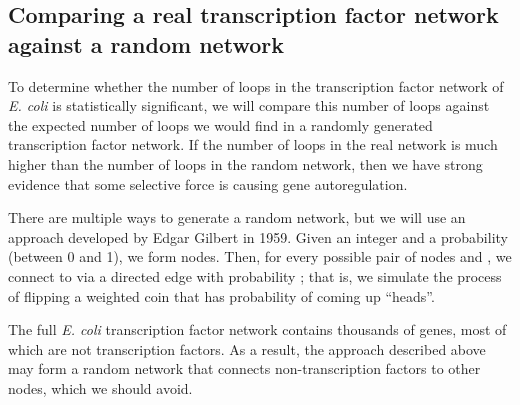\fudgespace

 \begin{qbox}\end{qbox}

\FloatBarrier
{}
\subsection{Comparing a real transcription factor network against a random network}

To determine whether the number of loops in the transcription factor network of \textit{E. coli} is statistically significant, we will compare this number of loops against the expected number of loops we would find in a randomly generated transcription factor network. If the number of loops in the real network is much higher than the number of loops in the random network, then we have strong evidence that some selective force is causing gene autoregulation.

There are multiple ways to generate a random network, but we will use an approach developed by Edgar Gilbert in 1959. Given an integer  and a probability  (between 0 and 1), we form  nodes. Then, for every possible pair of nodes  and , we connect  to  via a directed edge with probability ; that is, we simulate the process of flipping a weighted coin that has probability  of coming up ``heads''.\\

\begin{note}\end{note}

\fudgespace

\begin{qbox}\end{qbox}

\fudgespace

The full \textit{E. coli} transcription factor network contains thousands of genes, most of which are not transcription factors. As a result, the approach described above may form a random network that connects non-transcription factors to other nodes, which we should avoid.

